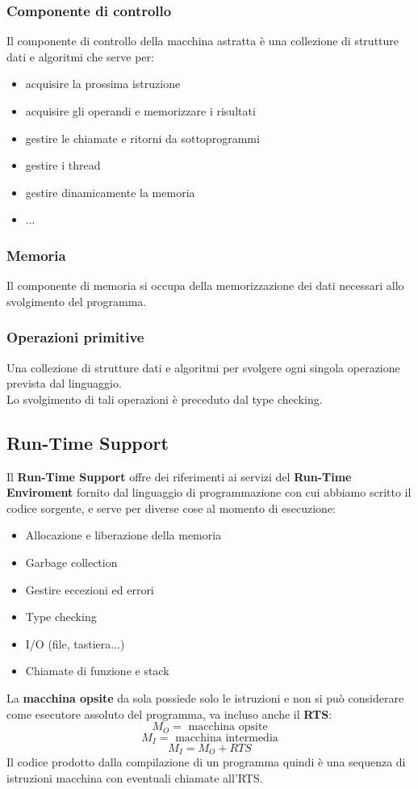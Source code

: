 \documentclass[12pt,a4paper]{article}
\begin{document}
\subsubsection{Componente di controllo}
Il componente di controllo della macchina astratta è una collezione di strutture dati e algoritmi che serve per:
\begin{itemize}
  \item acquisire la prossima istruzione
  \item acquisire gli operandi e memorizzare i risultati
  \item gestire le chiamate e ritorni da sottoprogrammi
  \item gestire i thread
  \item gestire dinamicamente la memoria
  \item ...
\end{itemize}
\subsubsection{Memoria}
Il componente di memoria si occupa della memorizzazione dei dati necessari allo svolgimento del programma.
\subsubsection{Operazioni primitive}
Una collezione di strutture dati e algoritmi per svolgere ogni singola operazione prevista dal linguaggio.\\
Lo svolgimento di tali operazioni è preceduto dal type checking.
\subsection{Run-Time Support}
Il \textbf{Run-Time Support} offre dei riferimenti ai servizi del \textbf{Run-Time Enviroment} fornito dal linguaggio di programmazione con cui abbiamo scritto il codice sorgente, e serve per diverse cose al momento di esecuzione:
\begin{itemize}
  \item Allocazione e liberazione della memoria
  \item Garbage collection
  \item Gestire eccezioni ed errori
  \item Type checking
  \item I/O (file, tastiera...)
  \item Chiamate di funzione e stack
\end{itemize}
La \textbf{macchina opsite} da sola possiede solo le istruzioni e non si può considerare come esecutore assoluto del programma, va incluso anche il \textbf{RTS}:
\[
M_O = \text{ macchina opsite}
\]
\[
M_I = \text{ macchina intermedia}
\]
\[
M_I = M_O + RTS
\]
Il codice prodotto dalla compilazione di un programma quindi è una sequenza di istruzioni macchina con eventuali chiamate all'RTS.
\end{document}
